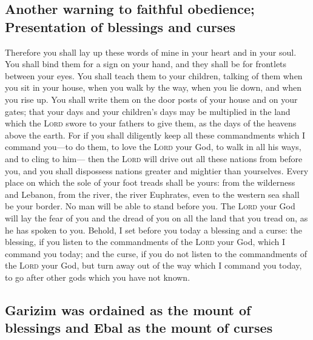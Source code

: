 \hypertarget{another-warning-to-faithful-obedience-presentation-of-blessings-and-curses}{%
\subsection{Another warning to faithful obedience; Presentation of
blessings and
curses}\label{another-warning-to-faithful-obedience-presentation-of-blessings-and-curses}}

 Therefore you shall lay up these words of mine in your
heart and in your soul. You shall bind them for a sign on your hand, and
they shall be for frontlets between your eyes.  You shall
teach them to your children, talking of them when you sit in your house,
when you walk by the way, when you lie down, and when you rise up.
 You shall write them on the door posts of your house and
on your gates;  that your days and your children's days
may be multiplied in the land which the \textsc{Lord} swore to your
fathers to give them, as the days of the heavens above the earth.
 For if you shall diligently keep all these commandments
which I command you---to do them, to love the \textsc{Lord} your God, to
walk in all his ways, and to cling to him---  then the
\textsc{Lord} will drive out all these nations from before you, and you
shall dispossess nations greater and mightier than yourselves.
 Every place on which the sole of your foot treads shall
be yours: from the wilderness and Lebanon, from the river, the river
Euphrates, even to the western sea shall be your border. 
No man will be able to stand before you. The \textsc{Lord} your God will
lay the fear of you and the dread of you on all the land that you tread
on, as he has spoken to you.  Behold, I set before you
today a blessing and a curse:  the blessing, if you
listen to the commandments of the \textsc{Lord} your God, which I
command you today;  and the curse, if you do not listen
to the commandments of the \textsc{Lord} your God, but turn away out of
the way which I command you today, to go after other gods which you have
not known.

\hypertarget{garizim-was-ordained-as-the-mount-of-blessings-and-ebal-as-the-mount-of-curses}{%
\subsection{Garizim was ordained as the mount of blessings and Ebal as
the mount of
curses}\label{garizim-was-ordained-as-the-mount-of-blessings-and-ebal-as-the-mount-of-curses}}

